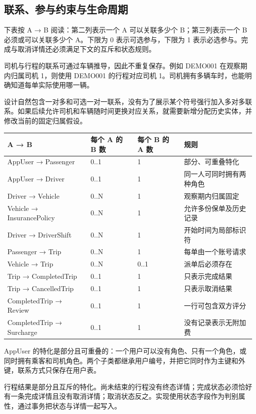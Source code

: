 \documentclass[11pt,a4paper]{article}
\begin{document}
\subsection{联系、参与约束与生命周期}
下表按 A → B 阅读：第二列表示一个 A 可以关联多少个 B；第三列表示一个 B 必须或可以关联多少个 A。下限为 0 表示可选参与，下限为 1 表示必选参与。完成与取消详情还必须满足下文的互斥和状态规则。

司机与行程的联系可通过车辆推导，因此不重复保存。例如 DEMO001 在观察期内归属司机 1，则使用 DEMO001 的行程对应司机 1。司机拥有多辆车时，也能明确知道每单实际使用哪一辆。

设计自然包含一对多和可选一对一联系，没有为了展示某个符号强行加入多对多联系。如果后续允许司机和车辆随时间更换对应关系，就需要新增分配历史实体，并修改当前的固定归属假设。

\par\begingroup\small\noindent
\begin{tabularx}{\linewidth}{p{4.3cm}p{1.3cm}p{1.3cm}X}
\toprule
A → B & 每个 A 的 B 数 & 每个 B 的 A 数 & 规则\\\midrule
AppUser → Passenger & 0..1 & 1 & 部分、可重叠特化\\
AppUser → Driver & 0..1 & 1 & 同一人可同时拥有两种角色\\
Driver → Vehicle & 0..N & 1 & 观察期内归属固定\\
Vehicle → InsurancePolicy & 0..N & 1 & 允许多份保单及历史记录\\
Driver → DriverShift & 0..N & 1 & 开始时间为局部标识符\\
Passenger → Trip & 0..N & 1 & 每单由一个账号请求\\
Vehicle → Trip & 0..N & 0..1 & 派单后必须存在\\
Trip → CompletedTrip & 0..1 & 1 & 只表示完成结果\\
Trip → CancelledTrip & 0..1 & 1 & 只表示取消结果\\
CompletedTrip → Review & 0..1 & 1 & 一行可包含双方评分\\
CompletedTrip → Surcharge & 0..1 & 1 & 没有记录表示无附加费\\
\bottomrule
\end{tabularx}
\par\endgroup

AppUser 的特化是部分且可重叠的：一个用户可以没有角色、只有一个角色，或同时拥有乘客和司机角色。两个子类都继承用户编号，并把它同时作为主键和外键，联系方式只保存在用户表。

行程结果是部分且互斥的特化。尚未结束的行程没有终态详情；完成状态必须恰好有一条完成详情且没有取消详情；取消状态反之。实现使用状态字段作为判别属性，通过事务把状态与详情一起写入。
\end{document}
